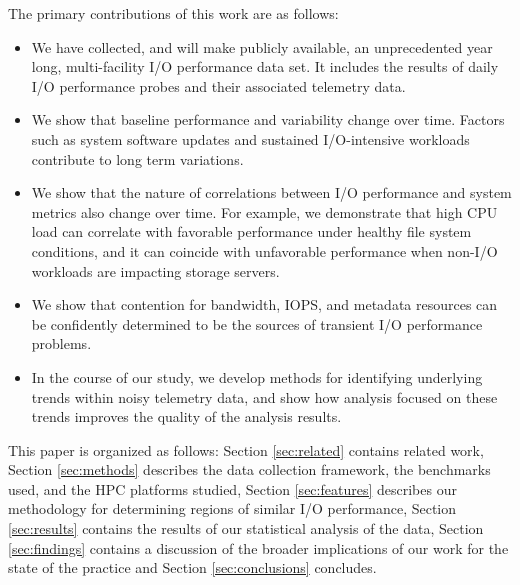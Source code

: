 

The primary contributions of this work are as follows: 
\begin{itemize}[leftmargin=*]
\item We have collected, and will make publicly available, an unprecedented year long, multi-facility
I/O performance data set. It includes the results of daily I/O performance
probes and their associated telemetry data.
\item We show that baseline performance and variability change over time.
Factors such as system software updates and sustained I/O-intensive workloads contribute to long term variations.
\item We show that the nature of correlations between I/O performance and system metrics also change over
time. For example, we demonstrate that high CPU load can correlate with favorable performance under healthy file system conditions, and it can coincide with unfavorable performance when non-I/O workloads are impacting storage servers.
\item We show that contention for bandwidth, IOPS, and metadata resources can be confidently determined to be the sources of transient I/O performance problems.
\item In the course of our study, we develop methods for identifying
underlying trends within noisy telemetry data, and show how analysis focused
on these trends improves the quality of the analysis results.
\end{itemize}


This paper is organized as follows: Section \ref{sec:related} contains related work, Section \ref{sec:methods} describes the data collection framework, the benchmarks used, and the HPC platforms studied, Section \ref{sec:features} describes our methodology for determining regions of similar I/O performance, Section \ref{sec:results} contains the results of our statistical analysis of the data, Section \ref{sec:findings} contains a discussion of the broader implications of our work for the state of the practice and Section \ref{sec:conclusions} concludes. 

